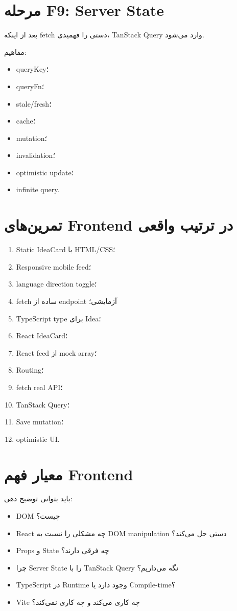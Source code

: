 \section{مرحله F9: Server State}

بعد از اینکه fetch دستی را فهمیدی، TanStack Query وارد می‌شود.

مفاهیم:
\begin{itemize}
  \item queryKey؛
  \item queryFn؛
  \item stale/fresh؛
  \item cache؛
  \item mutation؛
  \item invalidation؛
  \item optimistic update؛
  \item infinite query.
\end{itemize}

\section{تمرین‌های Frontend در ترتیب واقعی}

\begin{enumerate}
  \item Static IdeaCard با HTML/CSS؛
  \item Responsive mobile feed؛
  \item language direction toggle؛
  \item fetch ساده از endpoint آزمایشی؛
  \item TypeScript type برای Idea؛
  \item React IdeaCard؛
  \item React feed از mock array؛
  \item Routing؛
  \item fetch real API؛
  \item TanStack Query؛
  \item Save mutation؛
  \item optimistic UI.
\end{enumerate}

\section{معیار فهم Frontend}

باید بتوانی توضیح دهی:
\begin{itemize}
  \item DOM چیست؟
  \item React چه مشکلی را نسبت به DOM manipulation دستی حل می‌کند؟
  \item Props و State چه فرقی دارند؟
  \item چرا Server State را با TanStack Query نگه می‌داریم؟
  \item TypeScript در Runtime وجود دارد یا Compile-time؟
  \item Vite چه کاری می‌کند و چه کاری نمی‌کند؟
\end{itemize}
